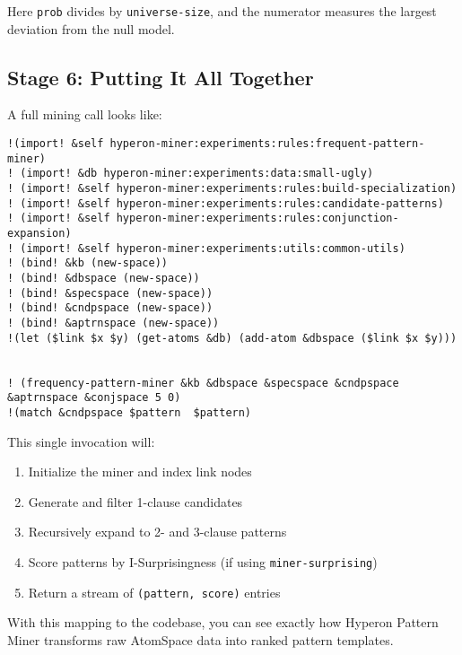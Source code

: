 \documentclass{article}
\begin{document}
Here \texttt{prob} divides by \texttt{universe-size}, and the numerator measures the largest deviation from the null model.

\subsection{Stage 6: Putting It All Together}

A full mining call looks like:

\begin{verbatim}
!(import! &self hyperon-miner:experiments:rules:frequent-pattern-miner)
! (import! &db hyperon-miner:experiments:data:small-ugly)
! (import! &self hyperon-miner:experiments:rules:build-specialization)
! (import! &self hyperon-miner:experiments:rules:candidate-patterns)
! (import! &self hyperon-miner:experiments:rules:conjunction-expansion)
! (import! &self hyperon-miner:experiments:utils:common-utils)
! (bind! &kb (new-space))
! (bind! &dbspace (new-space))
! (bind! &specspace (new-space))
! (bind! &cndpspace (new-space))
! (bind! &aptrnspace (new-space))
!(let ($link $x $y) (get-atoms &db) (add-atom &dbspace ($link $x $y)))


! (frequency-pattern-miner &kb &dbspace &specspace &cndpspace &aptrnspace &conjspace 5 0)
!(match &cndpspace $pattern  $pattern)
\end{verbatim}

This single invocation will:

\begin{enumerate}
  \item Initialize the miner and index link nodes
  \item Generate and filter 1-clause candidates
  \item Recursively expand to 2- and 3-clause patterns
  \item Score patterns by I-Surprisingness (if using \texttt{miner-surprising})
  \item Return a stream of \texttt{(pattern, score)} entries
\end{enumerate}

With this mapping to the codebase, you can see exactly how Hyperon Pattern Miner transforms raw AtomSpace data into ranked pattern templates.
\end{document}
